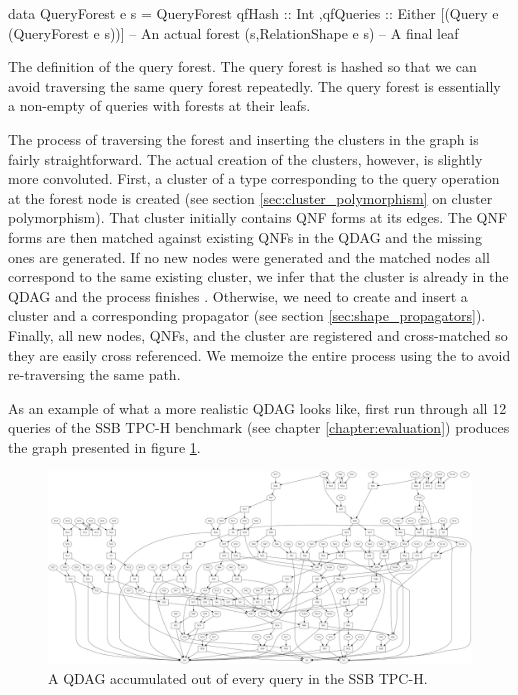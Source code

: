 \begin{code}
  \begin{haskellcode}
    data QueryForest e s =
      QueryForest
      { qfHash :: Int
        ,qfQueries
          :: Either
            [(Query e (QueryForest e s))] -- An actual forest
            (s,RelationShape e s) -- A final leaf
      }
  \end{haskellcode}

  \caption{\label{lst:query_forest}The definition of the query forest. The
    query forest is hashed so that we can avoid traversing the same
    query forest repeatedly. The query forest is essentially a
    non-empty of queries with forests at their leafs.}
\end{code}

The process of traversing the forest and inserting the clusters in the
graph is fairly straightforward. The actual creation of the clusters,
however, is slightly more convoluted. First, a cluster of a type
corresponding to the query operation at the forest node is created
(see section \ref{sec:cluster_polymorphism} on cluster
polymorphism). That cluster initially contains QNF forms at its
edges. The QNF forms are then matched against existing QNFs in the
QDAG and the missing ones are generated. If no new nodes were
generated and the matched nodes all correspond to the same existing
cluster, we infer that the cluster is already in the QDAG and the
process finishes . Otherwise, we need to create and insert a cluster
and a corresponding propagator (see section
\ref{sec:shape_propagators}). Finally, all new nodes, QNFs, and the
cluster are registered and cross-matched so they are easily cross
referenced.  We memoize the entire process using the  to
avoid re-traversing the same path.

As an example of what a more realistic QDAG looks like, first run
through all 12 queries of the SSB TPC-H benchmark (see chapter
\ref{chapter:evaluation}) produces the graph presented in figure
\ref{fig:ssb_graph}.

\begin{figure}[H]
  \centering
  \includegraphics[width=\textwidth]{./imgs/ssb_graph.pdf}
  \caption{\label{fig:ssb_graph}A QDAG accumulated out of every query
    in the SSB TPC-H.}
\end{figure}

